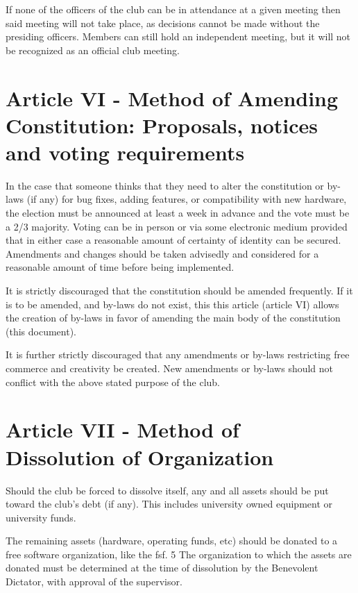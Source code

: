 \documentclass{article}
\begin{document}
	If none of the officers of the club can be in attendance at a given meeting then said meeting will not take place, as decisions cannot be made without the presiding officers. Members can still hold an independent meeting, but it will not be recognized as an official club meeting.

	\section{Article VI - Method of Amending Constitution: Proposals, notices and voting requirements}

	In the case that someone thinks that they need to alter the constitution or by-laws (if any) for bug fixes, adding features, or compatibility with new hardware, the election must be announced at least a week in advance and the vote must be a 2/3 majority. Voting can be in person or via some electronic medium provided that in either case a reasonable amount of certainty of identity can be secured. Amendments and changes should be taken advisedly and considered for a reasonable amount of time before being implemented.

	It is strictly discouraged that the constitution should be amended frequently. If it is to be amended, and by-laws do not exist, this this article (article VI) allows the creation of by-laws in favor of amending the main body of the constitution (this document).

	It is further strictly discouraged that any amendments or by-laws restricting free commerce and creativity be created. New amendments or by-laws should not conflict with the above stated purpose of the club.

	\section{Article VII - Method of Dissolution of Organization}

	Should the club be forced to dissolve itself, any and all assets should be put toward the club's debt (if any). This includes university owned equipment or university funds.

	The remaining assets (hardware, operating funds, etc) should be donated to a free software organization, like the fsf. 5 The organization to which the assets are donated must be determined at the time of dissolution by the Benevolent Dictator, with approval of the supervisor.
\end{document}
